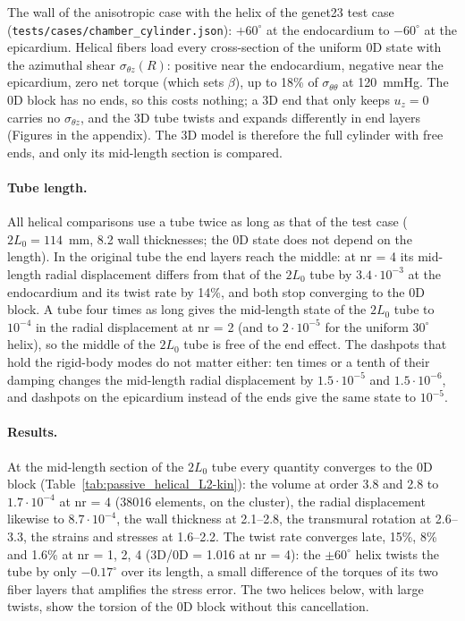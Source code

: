 The wall of the anisotropic case with the helix of the genet23 test case
(\texttt{tests/cases/chamber\_cylinder.json}): $+60^\circ$ at the endocardium to $-60^\circ$
at the epicardium. Helical fibers load every cross-section of the uniform 0D state with
the azimuthal shear $\sigma_{\theta z}(R)$: positive near the endocardium, negative near the
epicardium, zero net torque (which sets $\beta$), up to 18\% of $\sigma_{\theta\theta}$ at
120~mmHg. The 0D block has no ends, so this costs nothing; a 3D end that only keeps
$u_z = 0$ carries no $\sigma_{\theta z}$, and the 3D tube twists and expands differently
in end layers (Figures in the appendix). The 3D model is therefore the full cylinder
with free ends, and only its mid-length section is compared.

\paragraph{Tube length.} All helical comparisons use a tube twice as long as that of the
test case ($2L_0 = 114$~mm, 8.2 wall thicknesses; the 0D state does not depend on the
length). In the original tube the end layers reach the middle: at nr = 4 its mid-length
radial displacement differs from that of the $2L_0$ tube by $3.4\cdot10^{-3}$ at the
endocardium and its twist rate by 14\%, and both stop converging to the 0D block. A tube
four times as long gives the mid-length state of the $2L_0$ tube to $10^{-4}$ in the radial
displacement at nr = 2 (and to $2\cdot10^{-5}$ for the uniform $30^\circ$ helix), so the
middle of the $2L_0$ tube is free of the end effect. The dashpots that hold the rigid-body
modes do not matter either: ten times or a tenth of their damping changes the mid-length
radial displacement by $1.5\cdot10^{-5}$ and $1.5\cdot10^{-6}$, and dashpots on the
epicardium instead of the ends give the same state to $10^{-5}$.

\paragraph{Results.} At the mid-length section of the $2L_0$ tube every quantity converges
to the 0D block (Table~\ref{tab:passive_helical_L2-kin}): the volume at order 3.8 and 2.8 to
$1.7\cdot10^{-4}$ at nr = 4 (38016 elements, on the cluster), the radial displacement likewise
to $8.7\cdot10^{-4}$, the wall thickness at 2.1--2.8, the transmural rotation at 2.6--3.3, the
strains and stresses at 1.6--2.2. The twist rate converges late, 15\%, 8\% and 1.6\% at
nr = 1, 2, 4 (3D/0D = 1.016 at nr = 4): the $\pm60^\circ$ helix twists the tube by only
$-0.17^\circ$ over its length, a small difference of the torques of its two fiber layers
that amplifies the stress error. The two helices below, with large twists, show the
torsion of the 0D block without this cancellation.
